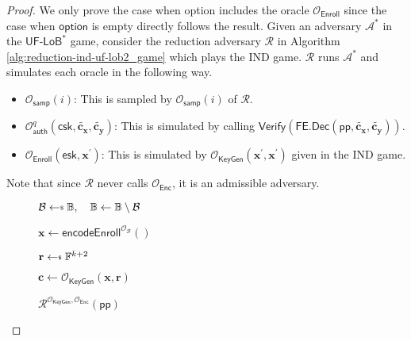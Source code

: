 \begin{proof}
\label{proof:ind-uf-lob2}
	We only prove the case when \textsf{option} includes the oracle $\mathcal{O}_{\textsf{Enroll}}$ since the case when $\textsf{option}$ is empty directly follows the result. Given an adversary $\mathcal{A}^*$ in the $\textsf{UF-LoB}^*$ game, consider the reduction adversary $\mathcal{R}$ in Algorithm \ref{alg:reduction-ind-uf-lob2_game} which plays the \textsf{IND} game. $\mathcal{R}$ runs $\mathcal{A}^*$ and simulates each oracle in the following way.

\begin{itemize}
	\item $\mathcal{O}_{\textsf{samp}}(i)$: This is sampled by $\mathcal{O}_{\textsf{samp}}(i)$ of $\mathcal{R}$.
	
	\item $\mathcal{O}_{\textsf{auth}}^q (\textsf{csk}, \mathbf{\tilde{c_x}}, \mathbf{\tilde{c_y}})$: This is simulated by calling $\textsf{Verify}( \textsf{FE.Dec}(\textsf{pp}, \mathbf{\tilde{c_x}}, \mathbf{\tilde{c_y}}) )$.

	\item $\mathcal{O}_{\textsf{Enroll}}( \textsf{esk}, \mathbf{x}^\prime )$: This is simulated by $\mathcal{O}_{\textsf{KeyGen}}(\mathbf{x}^\prime, \mathbf{x}^\prime)$ given in the \textsf{IND} game.

\end{itemize}

\noindent Note that since $\mathcal{R}$ never calls $\mathcal{O}_{\textsf{Enc}}$, it is an admissible adversary.

\begin{figure}[h]
\centering
	
	\begin{minipage}[t]{0.5\linewidth}
	\centering
	\begin{algorithm}[H]
		\caption{$\mathcal{R}^{\mathcal{O}_{\textsf{KeyGen}}, \mathcal{O}_{\textsf{Enc}}}(\textsf{pp})$}
	\label{alg:reduction-ind-uf-lob2_game}
	\begin{algorithmic}[1]
		\State $\mathcal{B} \getsdollar \mathbb{B}, \quad \mathbb{B} \gets \mathbb{B} \setminus \mathcal{B}$

		\State $\mathbf{x} \gets \textsf{encodeEnroll}^{\mathcal{O}_{\mathcal{B}}}()$

		\State $\mathbf{r} \getsdollar \mathbb{F}^{k+2}$
		
		\State $\mathbf{c} \gets \mathcal{O}_{\textsf{KeyGen}}(\mathbf{x}, \mathbf{r})$ \label{alg:reduction-ind-uf-lob2_game:c}


\end{algorithmic}
\end{algorithm}
\end{minipage}
\end{figure}
\end{proof}
